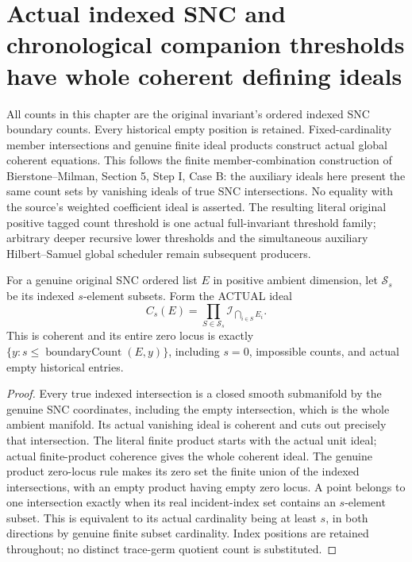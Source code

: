 \section{Actual indexed SNC and chronological companion thresholds have whole coherent defining ideals}

All counts in this chapter are the original invariant's ordered indexed SNC
boundary counts. Every historical empty position is retained. Fixed-cardinality
member intersections and genuine finite ideal products construct actual global
coherent equations. This follows the finite member-combination construction of
Bierstone--Milman\cite{bierstone-milman08-functoriality}, Section 5, Step I,
Case B: the auxiliary ideals here present the same count sets by vanishing
ideals of true SNC intersections. No equality with the source's weighted
coefficient ideal is asserted. The resulting literal original positive tagged
count threshold is one actual full-invariant threshold family; arbitrary deeper
recursive lower thresholds and the simultaneous auxiliary Hilbert--Samuel
global scheduler remain subsequent producers.

\begin{theorem}
\label{hir:original-indexed-snc-count-coherent-ideal}
\leanok
{}
For a genuine original SNC ordered list $E$ in positive ambient dimension,
let $\mathcal S_s$ be its indexed $s$-element subsets. Form the ACTUAL ideal
\[
 C_s(E)=\prod_{S\in\mathcal S_s}\mathcal I_{\bigcap_{i\in S}E_i}.
\]
This is coherent and its entire zero locus is exactly
$\{y:s\leq\operatorname{boundaryCount}(E,y)\}$, including $s=0$,
impossible counts, and actual empty historical entries.
\end{theorem}
\begin{proof}
Every true indexed intersection is a closed smooth submanifold by the genuine
SNC coordinates, including the empty intersection, which is the whole ambient
manifold. Its actual vanishing ideal is coherent and cuts out precisely that
intersection. The literal finite product starts with the actual unit ideal;
actual finite-product coherence gives the whole coherent ideal. The genuine
product zero-locus rule makes its zero set the finite union of the indexed
intersections, with an empty product having empty zero locus. A point belongs
to one intersection exactly when its real incident-index set contains an
$s$-element subset. This is equivalent to its actual cardinality being at least
$s$, in both directions by genuine finite subset cardinality. Index positions
are retained throughout; no distinct trace-germ quotient count is substituted.
\end{proof}

